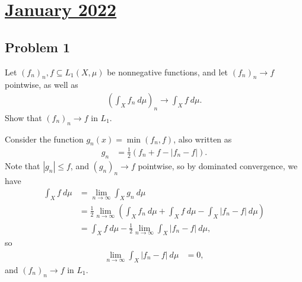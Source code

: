 \documentclass[10pt]{mypackage}
\begin{document}
\section{\href{https://math.virginia.edu/graduate/exams/analysis/2022Jan_real.pdf}{January 2022}}%
\subsection{Problem 1}%
\begin{problem}
  Let $\left( f_n \right)_n,f\subseteq L_1\left( X,\mu \right)$ be nonnegative functions, and let $\left( f_n \right)_n\rightarrow f$ pointwise, as well as
  \begin{align*}
    \left( \int_{X}^{} f_n\:d\mu \right)_n \rightarrow \int_{X}^{} f\:d\mu.
  \end{align*}
  Show that $\left( f_n \right)_n\rightarrow f$ in $L_1$.
\end{problem}
Consider the function $g_n(x) = \min\left( f_n,f \right)$, also written as
\begin{align*}
  g_n &= \frac{1}{2}\left( f_n + f - \left\vert f_n-f \right\vert \right).
\end{align*}
Note that $\left\vert g_n \right\vert\leq f$, and $\left( g_n \right)_n\rightarrow f$ pointwise, so by dominated convergence, we have 
\begin{align*}
  \int_{X}^{} f\:d\mu &= \lim_{n\rightarrow\infty} \int_{X}^{} g_n\:d\mu\\
                      &= \frac{1}{2}\lim_{n\rightarrow\infty} \left( \int_{X}^{} f_n\:d\mu + \int_{X}^{} f\:d\mu - \int_{X}^{} \left\vert f_n-f \right\vert\:d\mu \right)\\
                      &= \int_{X}^{} f\:d\mu - \frac{1}{2}\lim_{n\rightarrow\infty} \int_{X}^{} \left\vert f_n-f \right\vert\:d\mu,
\end{align*}
so
\begin{align*}
  \lim_{n\rightarrow\infty} \int_{X}^{} \left\vert f_n-f \right\vert\:d\mu &= 0,
\end{align*}
and $\left( f_n \right)_n\rightarrow f$ in $L_1$.
\end{document}
